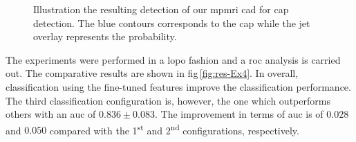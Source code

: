 \begin{figure}
  \hspace*{\fill}
 \hfill
 \hspace*{\fill}
  \caption[Illustration the resulting detection of our \acs*{mpmri}
  \acs*{cad} for \acs*{cap} detection.]{Illustration the resulting
    detection of our \acs*{mpmri} \acs*{cad} for \acs*{cap}
    detection. The blue contours corresponds to the \ac{cap} while the
    jet overlay represents the probability.}
  \label{fig:resultcad}
\end{figure}

The experiments were performed in a \ac{lopo} fashion and a \ac{roc}
analysis is carried out.
The comparative results are shown in \acs{fig}\,\ref{fig:res-Ex4}.
In overall, classification using the fine-tuned features improve the
classification performance.
The third classification configuration is, however, the one which
outperforms others with an \ac{auc} of $0.836 \pm 0.083$.
The improvement in terms of \ac{auc} is of $0.028$ and $0.050$
compared with the 1\textsuperscript{st} and 2\textsuperscript{nd}
configurations, respectively.

